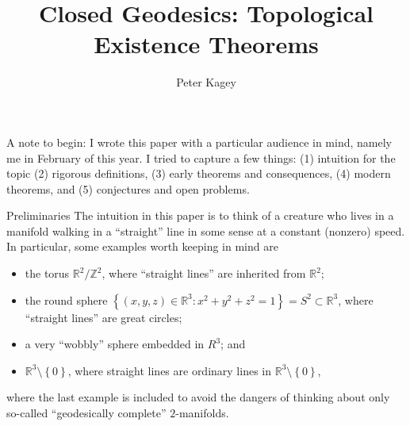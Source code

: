 \documentclass{article}
\newcommand{\set}[1]{\left\{#1\right\}}
\theoremstyle{definition}
\theoremstyle{remark}
\begin{document}
\title{Closed Geodesics: Topological Existence Theorems}
\author{Peter Kagey}

\maketitle

A note to begin: I wrote this paper with a particular audience in mind, namely
me in February of this year. I tried to capture a few things: (1) intuition for
the topic (2) rigorous definitions, (3) early theorems and consequences,
(4) modern theorems, and (5) conjectures and open problems.

\begin{section}{Preliminaries}
  The intuition in this paper is to think of a creature who lives in a manifold
  walking in a ``straight'' line in some sense at a constant
  (nonzero) speed. In particular, some examples worth keeping in mind are \begin{itemize}
    \item the torus $\mathbb R^2/\mathbb Z^2$, where ``straight lines'' are inherited from $\mathbb R^2$;
    \item the round sphere $\set{(x, y, z) \in \mathbb R^3 : x^2 + y^2 + z^2 = 1} = S^2 \subset \mathbb R^3$, where ``straight lines'' are great circles;
    \item a very ``wobbly'' sphere embedded in $R^3$; and
    \item $\mathbb R^3 \setminus \set{0}$, where straight lines are ordinary lines in $\mathbb R^3 \setminus \set 0$,
  \end{itemize}
  where the last example is included to avoid the dangers of thinking about only
  so-called ``geodesically complete'' $2$-manifolds.


\end{section}
\end{document}
